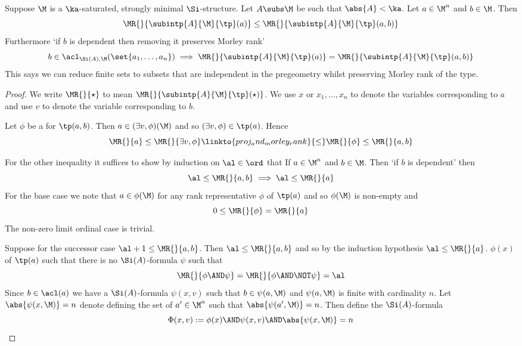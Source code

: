 \begin{lem}
    Suppose $\M$ is a $\ka$-saturated, strongly minimal $\Si$-structure.
    Let $A \subs \M$ be such that $\abs{A} < \ka$.
    Let $a \in \M^n$ and $b \in \M$.
    Then 
    \[\MR{}{\subintp{A}{\M}{\tp}(a)} \leq \MR{}{\subintp{A}{\M}{\tp}(a,b)}\]
    Furthermore `if $b$ is dependent then removing it preserves Morley rank'
    \[b \in \acl_{\Si(A),\M}(\set{a_1,\dots,a_n}) \implies 
    \MR{}{\subintp{A}{\M}{\tp}(a)} = \MR{}{\subintp{A}{\M}{\tp}(a,b)}\]
    This says we can reduce finite sets to subsets that are independent 
    in the pregeometry whilst preserving Morley rank of the type.
\end{lem}
\begin{proof}
    We write $\MR{}{\star}$ to mean $\MR{}{\subintp{A}{\M}{\tp}(\star)}$.
    We use $x$ or $x_1,\dots,x_n$ to denote the variables corresponding to $a$
    and use $v$ to denote the variable corresponding to $b$.

    Let $\phi$ be a 
    for $\tp(a,b)$.
    Then $a \in (\exists v, \phi)(\M)$ and so $(\exists v, \phi) \in \tp(a)$.
    Hence
    \[
        \MR{}{a} \leq \MR{}{\exists v, \phi} \linkto{proj_and_morley_rank}{\leq} 
        \MR{}{\phi} \leq \MR{}{a,b}
    \]

    For the other inequality
    it suffices to show by induction on $\al \in \ord$ that 
    If $a \in \M^n$ and $b \in \M$.
    Then `if $b$ is dependent' then 
    \[\al \leq \MR{}{a,b} \implies \al \leq \MR{}{a}\]
    For the base case we note that $a \in \phi(\M)$ for any rank representative 
    $\phi$ of $\tp(a)$ and so $\phi(\M)$ is non-empty and 
    \[0 \leq \MR{}{\phi} = \MR{}{a}\]
    The non-zero limit ordinal case is trivial.

    Suppose for the successor case $\al + 1 \leq \MR{}{a,b}$. 
    Then $\al \leq \MR{}{a,b}$ and so by the induction 
    hypothesis $\al \leq \MR{}{a}$.
    $\phi(x)$ of $\tp(a)$ such that 
    there is no $\Si(A)$-formula $\psi$ such that 
    \[\MR{}{\phi \AND \psi} = \MR{}{\phi \AND \NOT \psi} = \al\]
    Since $b \in \acl(a)$ we have a $\Si(A)$-formula $\psi(x,v)$ such that 
    $b \in \psi(a,\M)$ and $\psi(a,\M)$ is finite with cardinality $n$.
    Let $\abs{\psi(x,\M)} = n$ denote 
     defining the set of $a' \in \M^n$
    such that $\abs{\psi(a',\M)} = n$.
    Then define the $\Si(A)$-formula
    \[\Phi(x,v) := \phi(x) \AND \psi(x,v) \AND \abs{\psi(x,\M)} = n\]


\end{proof}
